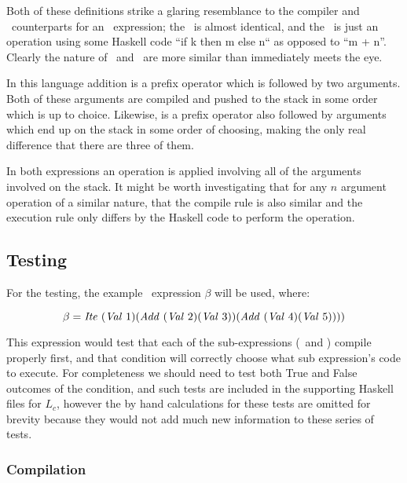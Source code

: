 \documentclass {article}
\begin{document}
Both of these definitions strike a glaring resemblance to
the compiler and \vm\ counterparts for an \add\ expression;
the \compp\ is almost identical, and the \exec\ is just an
operation using some Haskell code ``if k then m else n`` as 
opposed to ``m + n''.
Clearly the nature of \add\ and \ite\
are more similar than immediately meets the eye.

In this language
addition is a prefix operator which is followed by two arguments.
Both of these arguments are compiled and pushed to the stack
in some order which is up to choice. Likewise, \ite is a prefix operator also followed by arguments 
which end up on the stack in some order of choosing, 
making the only real difference that there are three of them.

In both expressions an operation is applied involving all 
of the arguments involved on the stack. It might be worth
investigating that for any $n$ argument operation of a similar
nature, that the compile rule is also similar and the 
execution rule only differs by the Haskell 
code to perform the operation.


\subsection{Testing}

For the testing, the example \ite\ expression $\beta$ will be used, where:

\[\beta = \mathit{Ite\ } (\mathit{Val\ } 1) 
	(\mathit{Add\ } (\mathit{Val\ } 2) (\mathit{Val\ } 3)) (\mathit{Add\ } (\mathit{Val\ } 4) (\mathit{Val\ } 5)))) \]

This expression would test that
each of the sub-expressions 
(\add\ and \val) compile properly first, 
and that condition will correctly  choose what
 sub expression's code to execute.
For completeness we should need to 
test both True and False outcomes of the condition, and
such tests are included in the supporting Haskell files for $L_c$, 
however the by hand calculations for these tests are omitted
for brevity because they would not add much new
information to these series of tests.

\subsubsection{Compilation}
\end{document}

